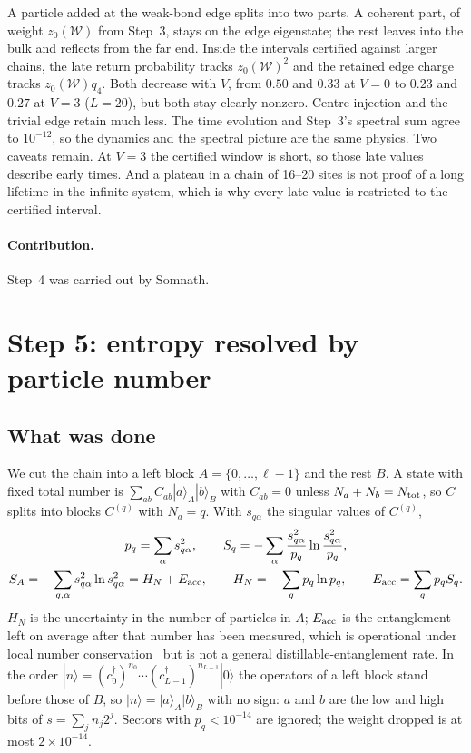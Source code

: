 \documentclass[11pt,a4paper]{article}
\newcommand{\dg}{^{\dagger}}
\begin{document}
A particle added at the weak-bond edge splits into two parts. A coherent part, of weight $z_0(\mathcal{W})$ from Step~3, stays on the edge eigenstate; the rest leaves into the bulk and reflects from the far end. Inside the intervals certified against larger chains, the late return probability tracks $z_0(\mathcal{W})^2$ and the retained edge charge tracks $z_0(\mathcal{W})q_4$. Both decrease with $V$, from $0.50$ and $0.33$ at $V=0$ to $0.23$ and $0.27$ at $V=3$ ($L=20$), but both stay clearly nonzero. Centre injection and the trivial edge retain much less. The time evolution and Step~3's spectral sum agree to $10^{-12}$, so the dynamics and the spectral picture are the same physics. Two caveats remain. At $V=3$ the certified window is short, so those late values describe early times. And a plateau in a chain of 16--20 sites is not proof of a long lifetime in the infinite system, which is why every late value is restricted to the certified interval.

\paragraph{Contribution.} Step~4 was carried out by Somnath.

\section{Step 5: entropy resolved by particle number}
\label{sec:step5}

\subsection{What was done}

We cut the chain into a left block $A=\{0,\dots,\ell-1\}$ and the rest $B$.
A state with fixed total number is $\sum_{ab}C_{ab}|a\rangle_A|b\rangle_B$ with $C_{ab}=0$ unless $N_a+N_b=N_{\rm tot}$, so $C$ splits into blocks $C^{(q)}$ with $N_a=q$.
With $s_{q\alpha}$ the singular values of $C^{(q)}$,
\begin{gather}
  p_q=\sum_\alpha s_{q\alpha}^2,\qquad
  S_q=-\sum_\alpha\frac{s_{q\alpha}^2}{p_q}\ln\frac{s_{q\alpha}^2}{p_q},
  \label{eq:sectors}\\
  S_A=-\sum_{q,\alpha}s_{q\alpha}^2\ln s_{q\alpha}^2=H_N+E_{\rm acc},\qquad
  H_N=-\sum_qp_q\ln p_q,\qquad E_{\rm acc}=\sum_qp_qS_q .
  \label{eq:split}
\end{gather}
$H_N$ is the uncertainty in the number of particles in $A$; $E_{\rm acc}$ is the entanglement left on average after that number has been measured, which is operational under local number conservation~\cite{monkman} but is not a general distillable-entanglement rate.
In the order $|n\rangle=(c_0\dg)^{n_0}\cdots(c_{L-1}\dg)^{n_{L-1}}|0\rangle$ the operators of a left block stand before those of $B$, so $|n\rangle=|a\rangle_A|b\rangle_B$ with no sign: $a$ and $b$ are the low and high bits of $s=\sum_jn_j2^j$.
Sectors with $p_q<10^{-14}$ are ignored; the weight dropped is at most $2\times10^{-14}$.
\end{document}
